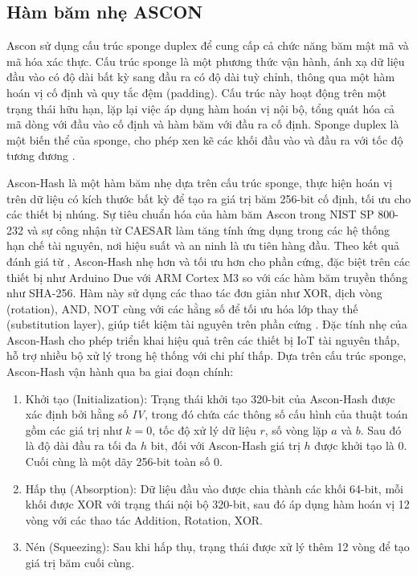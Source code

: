 \subsection{Hàm băm nhẹ ASCON}
\label{sec:ascon-hash}
Ascon sử dụng cấu trúc sponge duplex để cung cấp cả chức năng băm mật mã và mã hóa xác thực. Cấu trúc sponge là một phương thức vận hành, ánh xạ dữ liệu đầu vào có độ dài bất kỳ sang đầu ra có độ dài tuỳ chỉnh, thông qua một hàm hoán vị cố định và quy tắc đệm (padding). 
Cấu trúc này hoạt động trên một trạng thái hữu hạn, lặp lại việc áp dụng hàm hoán vị nội bộ, tổng quát hóa cả mã dòng với đầu vào cố định và hàm băm với đầu ra cố định. Sponge duplex là một biến thể của sponge, cho phép xen kẽ các khối đầu vào và đầu ra với tốc độ tương đương \cite{Ascon-Hash}.

Ascon-Hash là một hàm băm nhẹ dựa trên cấu trúc sponge, thực hiện hoán vị trên dữ liệu có kích thước bất kỳ để tạo ra giá trị băm 256-bit cố định, tối ưu cho các thiết bị nhúng. Sự tiêu chuẩn hóa của hàm băm Ascon trong NIST SP 800-232 và sự công nhận từ CAESAR làm tăng tính ứng dụng trong các hệ thống hạn chế tài nguyên, nơi hiệu suất và an ninh là ưu tiên hàng đầu. 
Theo kết quả đánh giá từ \cite{ascon-hash-2}, Ascon-Hash nhẹ hơn và tối ưu hơn cho phần cứng, đặc biệt trên các thiết bị như Arduino Due với ARM Cortex M3 so với các hàm băm truyền thống như SHA-256.
Hàm này sử dụng các thao tác đơn giản như XOR, dịch vòng (rotation), AND, NOT cùng với các hằng số để tối ưu hóa lớp thay thế (substitution layer), giúp tiết kiệm tài nguyên trên phần cứng \cite{Ascon-Hash}. Đặc tính nhẹ của Ascon-Hash cho phép triển khai hiệu quả trên các thiết bị IoT tài nguyên thấp, hỗ trợ nhiều bộ xử lý trong hệ thống với chi phí thấp.
Dựa trên cấu trúc sponge, Ascon-Hash vận hành qua ba giai đoạn chính: 
\begin{enumerate}
    \item Khởi tạo (Initialization): Trạng thái khởi tạo 320-bit của Ascon-Hash được xác định bởi hằng số \textit{IV}, trong đó chứa các thông số cấu hình của thuật toán gồm các giá trị như $k=0$, tốc độ xử lý dữ liệu $r$, số vòng lặp $a$ và $b$. Sau đó là độ dài đầu ra tối đa $h$ bit, đối với Ascon-Hash giá trị $h$ được khởi tạo là 0. Cuối cùng là một dãy 256-bit toàn số 0.
    \item Hấp thụ (Absorption): Dữ liệu đầu vào được chia thành các khối 64-bit, mỗi khối được XOR với trạng thái nội bộ 320-bit, sau đó áp dụng hàm hoán vị 12 vòng với các thao tác Addition, Rotation, XOR.
    \item Nén (Squeezing): Sau khi hấp thụ, trạng thái được xử lý thêm 12 vòng để tạo giá trị băm cuối cùng. 
\end{enumerate}

